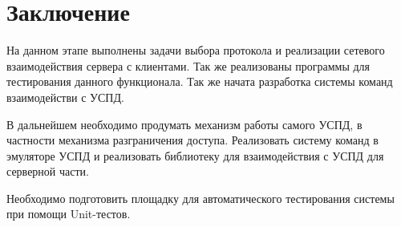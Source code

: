 \newpage
\section{Заключение}

На данном этапе выполнены задачи выбора протокола и реализации сетевого взаимодействия сервера с клиентами. Так же реализованы программы для тестирования данного функционала. Так же начата разработка системы команд взаимодействи с УСПД. 

В дальнейшем необходимо продумать механизм работы самого УСПД, в частности механизма разграничения доступа. Реализовать систему команд в эмуляторе УСПД и реализовать библиотеку для взаимодействия с УСПД для серверной части.

Необходимо подготовить площадку для автоматического тестирования системы при помощи Unit-тестов.